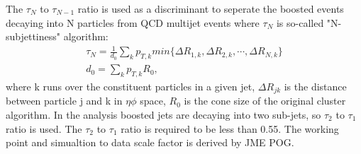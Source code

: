 The $\tau _N $ to $\tau _{N-1}$ ratio is used as a discriminant to seperate the boosted events decaying into N particles from QCD multijet events where $\tau _N $ is so-called "N-subjettiness" algorithm:
\begin{equation} \label{eq6}
\begin{split}
\tau _N = \frac{1}{d_0} \sum\limits_{k}  p_{T,k} min \{ \Delta R_{1,k},\Delta R_{2,k},\cdots,\Delta R_{N,k} \} \\
d_0 = \sum\limits_{k}  p_{T,k} R_0,
\end{split}
\end{equation}
where k runs over the constituent particles in a given jet, $\Delta R_{jk}$ is the distance between particle j and k in $\eta \phi$ space, $R_0$ is the cone size of the original cluster algorithm. In the analysis boosted jets are decaying into two sub-jets, so $\tau _2 $ to $\tau _1$ ratio is used.
The $\tau _2 $ to $\tau _1$ ratio is required to be less than 0.55.  
The working point and simualtion to data scale factor is derived by JME POG.

